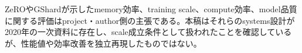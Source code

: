 \begin{claimboundary}
ZeROやGShardが示したmemory効率、training scale、compute効率、model品質に関する評価はproject・author側の主張である。本稿はそれらのsystems設計が2020年の一次資料に存在し、scale成立条件として扱われたことを確認しているが、性能値や効率改善を独立再現したものではない。\autocite{src-56ccf2fa5ce7,src-f1047e7f654c}
\end{claimboundary}
